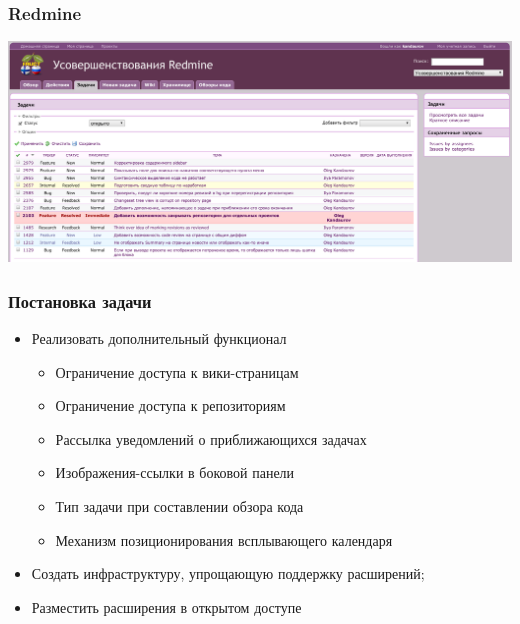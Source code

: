 \documentclass[unicode]{beamer}
\begin{document}
\begin{frame}
\transwipe[direction=90]
\frametitle{Redmine}
\centerline{\includegraphics[scale=0.32]{redmine-issues.png}}
\end{frame}

\begin{frame}
\transwipe[direction=90]
\frametitle{Постановка задачи}
\begin{block}{}
\begin{itemize}
  \item Реализовать дополнительный функционал
  \begin{itemize}
    \item Ограничение доступа к вики-страницам
    \item Ограничение доступа к репозиториям
    \item Рассылка уведомлений о приближающихся задачах
    \item Изображения-ссылки в боковой панели
    \item Тип задачи при составлении обзора кода
    \item Механизм позиционирования всплывающего календаря
  \end{itemize}
  \item Создать инфраструктуру, упрощающую поддержку расширений;
  \item Разместить расширения в открытом доступе
\end{itemize}
\end{block}
\end{frame}
\end{document}

